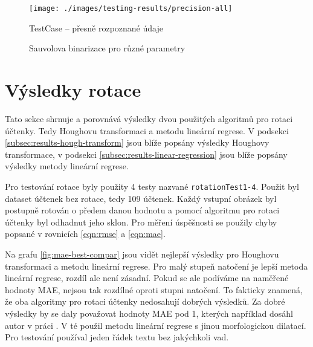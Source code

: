 \documentclass[thesis=B,czech]{FITthesis}[2019/12/23]
\def\myit#1{\texttt{#1}}
\begin{document}
 \begin{figure}[H]
     \centering
     \texttt{[image: ./images/testing-results/precision-all]}
     \caption{TestCase -- přesně rozpoznané údaje}
     \label{fig:testCase-precision-all}
 \end{figure}


\begin{figure}[p]
    \centering
    \hspace{1pt}
    \hspace{1pt}
    \hspace{1pt}
    \caption{Sauvolova binarizace pro různé parametry}
    \label{fig:bad-sauvola-result}
\end{figure}

\newpage
\section{Výsledky rotace}
\label{sec:rotation-results}

Tato sekce shrnuje a porovnává výsledky dvou použitých algoritmů pro rotaci účtenky. Tedy Houghovu transformaci a metodu lineární regrese. V podsekci \ref{subsec:results-hough-transform} jsou blíže popsány výsledky Houghovy transformace, v podsekci \ref{subsec:results-linear-regression} jsou blíže popsány výsledky metody lineární regrese.

Pro testování rotace byly použity 4 testy nazvané \myit{rotationTest1-4}. Použit byl dataset účtenek bez rotace, tedy 109 účtenek. Každý vstupní obrázek byl postupně rotován o předem danou hodnotu a pomocí algoritmu pro rotaci účtenky byl odhadnut jeho sklon. Pro měření úspěšnosti se použily chyby popsané v rovnicích \ref{eqn:rmse} a \ref{eqn:mae}.

Na grafu \ref{fig:mae-best-compar} jsou vidět nejlepší výsledky pro Houghovu transformaci a metodu lineární regrese. Pro malý stupeň natočení je lepší metoda lineární regrese, rozdíl ale není zásadní. Pokud se ale podíváme na naměřené hodnoty MAE, nejsou tak rozdílné oproti stupni natočení. To fakticky znamená, že oba algoritmy pro rotaci účtenky nedosahují dobrých výsledků. Za dobré výsledky by se daly považovat hodnoty MAE pod 1, kterých například dosáhl autor v práci \cite{Brodic2012}. V té použil metodu lineární regrese s jinou morfologickou dilatací. Pro testování používal jeden řádek textu bez jakýchkoli vad.
\end{document}
